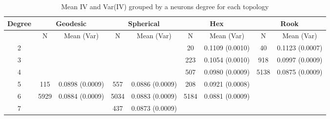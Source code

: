 \begin{table}[hbt]
\centering
\caption{Mean IV and Var(IV) grouped by a neurons degree for each topology}
\label{meanvar1}
\begin{tabular}{|c||c|c||c|c||c|c||c|c|}
\hline
\textbf{Degree} & \multicolumn{2}{c||}{\textbf{Geodesic}} &
\multicolumn{2}{c||}{\textbf{Spherical}} & \multicolumn{2}{c||}{\textbf{Hex}} &
\multicolumn{2}{c|}{\textbf{Rook}} \\
\hline
& N & Mean (Var) & N & Mean (Var) & N & Mean (Var) & N & Mean (Var) \\

\hline
2&&&&& 20& 0.1109 (0.0010)& 40& 0.1123 (0.0007)\\ 
3&&&&& 223& 0.1054 (0.0010)& 918& 0.0997 (0.0009)\\ 
4&&&&& 507& 0.0980 (0.0009)& 5138& 0.0875 (0.0009)\\ 
5& 115& 0.0898 (0.0009)& 557& 0.0886 (0.0009)& 208& 0.0921 (0.0008)&&\\ 
6& 5929& 0.0884 (0.0009)& 5034& 0.0883 (0.0009)& 5184& 0.0881 (0.0009)&&\\ 
7&&& 437& 0.0873 (0.0009)&&&&\\ 
\hline
\end{tabular} \end{table}



